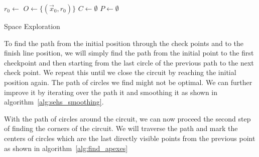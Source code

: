 \vspace{1cm}
\begin{algorithm}[H]
	\SetAlgoLined
	\DontPrintSemicolon
	
	
	
	$r_0\gets$ \;
	$O\gets\{(\vec{x}_0, r_0)\}$ 
	$C\gets\emptyset$ 
	$P\gets\emptyset$ 
	
	
	\caption{Space Exploration}
	\label{alg:space_exploration}
\end{algorithm}
\vspace{1cm}

To find the path from the initial position through the check points and to the finish line position, we will simply find the path from the initial point to the first checkpoint and then starting from the last circle of the previous path to the next check point. We repeat this until we close the circuit by reaching the initial position again. The path of circles we find might not be optimal. We can further improve it by iterating over the path it and smoothing it as shown in algorithm~\ref{alg:sehs_smoothing}.

With the path of circles around the circuit, we can now proceed the second step of finding the corners of the circuit. We will traverse the path and mark the centers of circles which are the last directly visible points from the previous point as shown in algorithm~\ref{alg:find_apexes}

